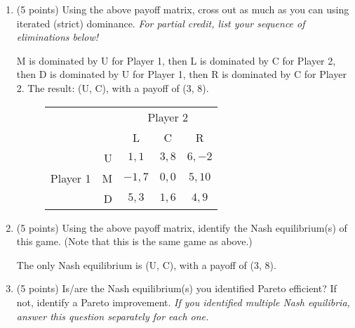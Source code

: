 \documentclass[twoside]{article}
\newcommand{\mybigskip}{\vspace{1in}}
\begin{document}
\begin{enumerate}
    \begin{enumerate}
    \item (5 points) Using the above payoff matrix, cross out as much as you can using iterated (strict) dominance. \emph{For partial credit, list your sequence of eliminations below!}
    \begin{EXAM}\mybigskip\end{EXAM}
    
\begin{KEY}
M is dominated by U for Player 1, then L is dominated by C for Player 2, then D is dominated by U for Player 1, then R is dominated by C for Player 2. The result: (U, C), with a payoff of (3, 8). 
\end{KEY}

    \begin{figure}[h]
    \begin{center}
    \begin{tabular}{crccc}
    & & \multicolumn{3}{c}{Player 2} \\ [.15cm]
    & & L & C & R \\ \cline{3-5}
    \multirow{3}{1.5cm}{Player 1} 
    & U & \multicolumn{1}{|c|}{$1,1$} & \multicolumn{1}{c}{$3,8$} & \multicolumn{1}{|c|}{$6,-2$} \\ \cline{3-5}
    & M & \multicolumn{1}{|c|}{$-1,7$} & \multicolumn{1}{c}{$0,0$} & \multicolumn{1}{|c|}{$5,10$} \\ \cline{3-5}
    & D & \multicolumn{1}{|c|}{$5,3$} & \multicolumn{1}{c}{$1,6$} & \multicolumn{1}{|c|}{$4,9$} \\ \cline{3-5}
    \end{tabular}
    \end{center}
    \end{figure}
    
    \item (5 points) Using the above payoff matrix, identify the Nash equilibrium(s) of this game. (Note that this is the same game as above.)
    \begin{EXAM}\bigskip\end{EXAM}
    
\begin{KEY}
The only Nash equilibrium is (U, C), with a payoff of (3, 8). 
\end{KEY}

    
    \item (5 points) Is/are the Nash equilibrium(s) you identified Pareto efficient? If not, identify a Pareto improvement. \emph{If you identified multiple Nash equilibria, answer this question separately for each one.}     \begin{EXAM}\mybigskip\end{EXAM}
    

\end{enumerate}
\end{enumerate}
\end{document}

